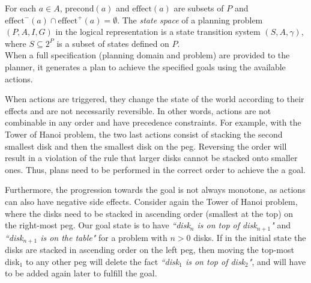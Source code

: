 For each $a \in A$, $\text{precond}(a)$ and $\text{effect}(a)$ are subsets of $P$ and $\text{effect}^{-}(a) \cap \text{effect}^{+}(a) = \emptyset$. 
The {\em state space} of a planning problem $(P, A, I, G)$ in the logical representation is a state transition system $(S, A, \gamma)$, where $S\subseteq 2^{P}$ is a subset of states defined on $P$.\\

When a full specification (planning domain and problem) are provided to the planner, it generates a plan to achieve the specified goals using the available actions.

When actions are triggered, they change the state of the world according to their effects and are not necessarily reversible. 
In other words, actions are not combinable in any order and have precedence constraints. 
For example, with the Tower of Hanoi problem, the two last actions consist of stacking the second smallest disk and then the smallest disk on the peg. 
Reversing the order will result in a violation of the rule that larger disks cannot be stacked onto smaller ones. Thus, plans need to be performed in the correct order to achieve the a goal.

Furthermore, the progression towards the goal is not always monotone, as actions can also have negative side effects. 
Consider again the Tower of Hanoi problem, where the disks need to be stacked in ascending order (smallest at the top) on the right-most peg. 
Our goal state is to have \textit{``disk$_{n}$ is on top of disk$_{n+1}$"} and \textit{``disk$_{n+1}$ is on the table"} for a problem with $n>0$ disks. 
If in the initial state the disks are stacked in ascending order on the left peg, then moving the top-most disk$_1$ to any other peg will delete the fact \textit{``disk$_1$ is on top of disk$_2$"}, and will have to be added again later to fulfill the goal.




